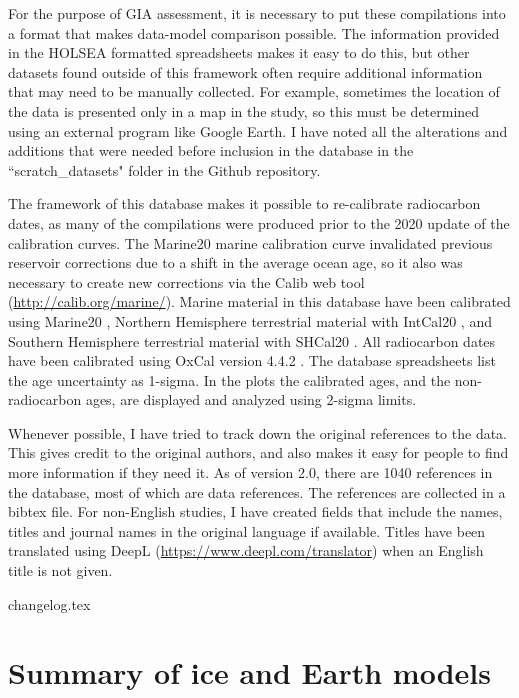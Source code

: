 \documentclass[a4paper,12pt]{article}
\begin{document}
For the purpose of GIA assessment, it is necessary to put these compilations into a format that makes data-model comparison possible. The information provided in the HOLSEA formatted spreadsheets makes it easy to do this, but other datasets found outside of this framework often require additional information that may need to be manually collected. For example, sometimes the location of the data is presented only in a map in the study, so this must be determined using an external program like Google Earth. I have noted all the alterations and additions that were needed before inclusion in the database in the ``scratch\_datasets" folder in the Github repository.

The framework of this database makes it possible to re-calibrate radiocarbon dates, as many of the compilations were produced prior to the 2020 update of the calibration curves. The Marine20 marine calibration curve \citep{HeatonEtal2020} invalidated previous reservoir corrections due to a shift in the average ocean age, so it also was necessary to create new corrections via the Calib web tool (\url{http://calib.org/marine/}). Marine material in this database have been calibrated using Marine20 \citep{HeatonEtal2020}, Northern Hemisphere terrestrial material with IntCal20 \citep{ReimerEtal2020}, and Southern Hemisphere terrestrial material with SHCal20 \citep{HoggEtal2020}. All radiocarbon dates have been calibrated using OxCal version 4.4.2 \citep{BronkRamsey2009}. The database spreadsheets list the age uncertainty as 1-sigma. In the plots the calibrated ages, and the non-radiocarbon ages, are displayed and analyzed using 2-sigma limits.


Whenever possible, I have tried to track down the original references to the data. This gives credit to the original authors, and also makes it easy for people to find more information if they need it. As of version 2.0, there are 1040 references in the database, most of which are data references. The references are collected in a bibtex file. For non-English studies, I have created fields that include the names, titles and journal names in the original language if available. Titles have been translated using DeepL (\url{https://www.deepl.com/translator}) when an English title is not given.



{changelog.tex}


\section{Summary of ice and Earth models}
\end{document}
